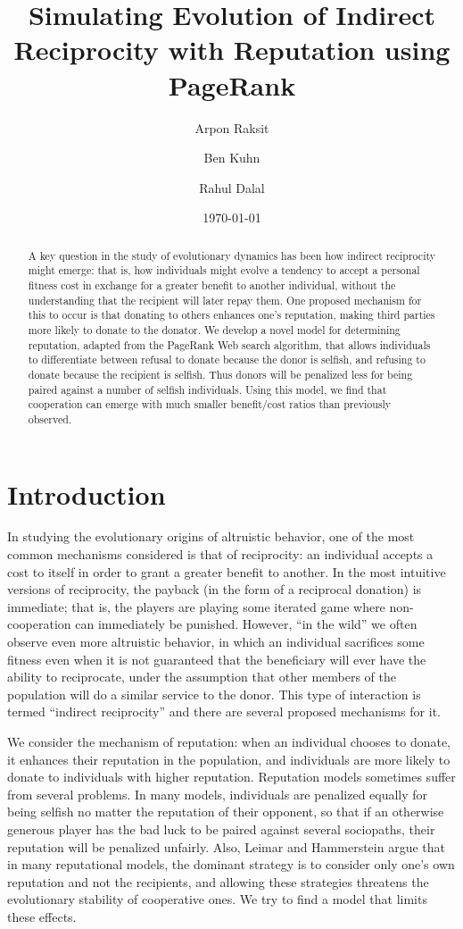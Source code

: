 \documentclass{amsart}
\title[Simulating indirect reciprocity using PageRank]{Simulating
  Evolution of Indirect Reciprocity with Reputation using PageRank}
\author{Arpon Raksit \and Ben Kuhn \and Rahul Dalal}
\date{\today}
\begin{document}
\begin{abstract}
A key question in the study of evolutionary dynamics has been how
indirect reciprocity might emerge: that is, how individuals might
evolve a tendency to accept a personal fitness cost in exchange for a
greater benefit to another individual, without the understanding that
the recipient will later repay them. One proposed mechanism for this
to occur is that donating to others enhances one's reputation, making
third parties more likely to donate to the donator. We develop a novel
model for determining reputation, adapted from the PageRank Web search
algorithm, that allows individuals to differentiate between refusal to
donate because the donor is selfish, and refusing to donate because
the recipient is selfish. Thus donors will be penalized less for being
paired against a number of selfish individuals. Using this model, we
find that cooperation can emerge with much smaller benefit/cost ratios
than previously observed.
\end{abstract}

\maketitle

\section{Introduction}

In studying the evolutionary origins of altruistic behavior, one of
the most common mechanisms considered is that of reciprocity: an
individual accepts a cost to itself in order to grant a greater
benefit to another. In the most intuitive versions of reciprocity, the
payback (in the form of a reciprocal donation) is immediate; that is,
the players are playing some iterated game where non-cooperation can
immediately be punished. However, ``in the wild'' we often observe
even more altruistic behavior, in which an individual sacrifices some
fitness even when it is not guaranteed that the beneficiary will ever
have the ability to reciprocate, under the assumption that other
members of the population will do a similar service to the donor. This
type of interaction is termed ``indirect reciprocity'' and there are
several proposed mechanisms for it.

We consider the mechanism of reputation: when an individual chooses to
donate, it enhances their reputation in the population, and
individuals are more likely to donate to individuals with higher
reputation. Reputation models sometimes suffer from several
problems. In many models, individuals are penalized equally for being
selfish no matter the reputation of their opponent, so that if an
otherwise generous player has the bad luck to be paired against
several sociopaths, their reputation will be penalized unfairly. Also,
Leimar and Hammerstein \cite{leimar_evolution_2001} argue that in many
reputational models, the dominant strategy is to consider only one's
own reputation and not the recipients, and allowing these strategies
threatens the evolutionary stability of cooperative ones. We try to
find a model that limits these effects.
\end{document}
